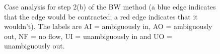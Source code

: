 \documentclass[preprint,a4paper]{elsarticle}
\newenvironment{stusubfig}[1]
{
	\begin{figure}[#1]
	\begin{center}
}
{
	\end{center}
	\end{figure}
}
\begin{document}
\begin{stusubfig}{p}
	\hspace{4mm}
\caption[Case analysis for step 2(b) of the BW method]{Case analysis for step 2(b) of the BW method (a blue edge indicates that the edge would be contracted; a red edge indicates that it wouldn't). The labels are AI = ambiguously in, AO = ambiguously out, NF = no flow, UI = unambiguously in and UO = unambiguously out.}
\label{fig:segmentation-waterfall-smg-mergecases}
\end{stusubfig}
\end{document}
